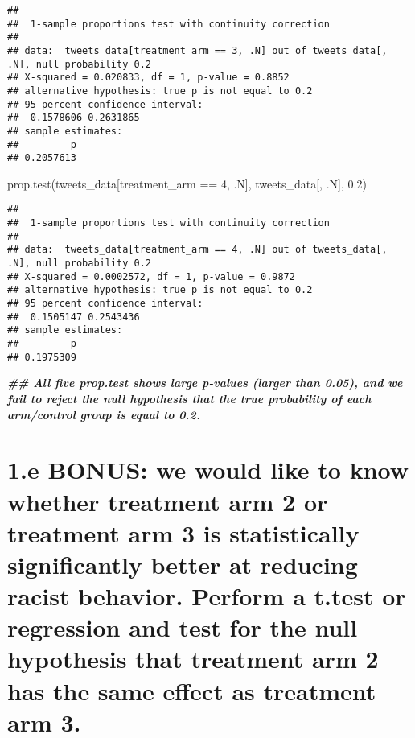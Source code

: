 \documentclass[
]{article}
\newenvironment{Shaded}{\begin{snugshade}}{\end{snugshade}}
\newcommand{\DecValTok}[1]{\textcolor[rgb]{0.00,0.00,0.81}{#1}}
\newcommand{\DocumentationTok}[1]{\textcolor[rgb]{0.56,0.35,0.01}{\textbf{\textit{#1}}}}
\newcommand{\FloatTok}[1]{\textcolor[rgb]{0.00,0.00,0.81}{#1}}
\newcommand{\FunctionTok}[1]{\textcolor[rgb]{0.00,0.00,0.00}{#1}}
\newcommand{\NormalTok}[1]{#1}
\newcommand{\SpecialCharTok}[1]{\textcolor[rgb]{0.00,0.00,0.00}{#1}}
\begin{document}
\begin{verbatim}
## 
##  1-sample proportions test with continuity correction
## 
## data:  tweets_data[treatment_arm == 3, .N] out of tweets_data[, .N], null probability 0.2
## X-squared = 0.020833, df = 1, p-value = 0.8852
## alternative hypothesis: true p is not equal to 0.2
## 95 percent confidence interval:
##  0.1578606 0.2631865
## sample estimates:
##         p 
## 0.2057613
\end{verbatim}

\begin{Shaded}
\begin{Highlighting}[]
\FunctionTok{prop.test}\NormalTok{(tweets\_data[treatment\_arm }\SpecialCharTok{==} \DecValTok{4}\NormalTok{, .N], tweets\_data[, .N], }\FloatTok{0.2}\NormalTok{)}
\end{Highlighting}
\end{Shaded}

\begin{verbatim}
## 
##  1-sample proportions test with continuity correction
## 
## data:  tweets_data[treatment_arm == 4, .N] out of tweets_data[, .N], null probability 0.2
## X-squared = 0.0002572, df = 1, p-value = 0.9872
## alternative hypothesis: true p is not equal to 0.2
## 95 percent confidence interval:
##  0.1505147 0.2543436
## sample estimates:
##         p 
## 0.1975309
\end{verbatim}

\begin{Shaded}
\begin{Highlighting}[]
\DocumentationTok{\#\# All five prop.test shows large p{-}values (larger than 0.05), and we fail to reject the null hypothesis that the true probability of each arm/control group is equal to 0.2.}
\end{Highlighting}
\end{Shaded}

\hypertarget{e-bonus-we-would-like-to-know-whether-treatment-arm-2-or-treatment-arm-3-is-statistically-significantly-better-at-reducing-racist-behavior.-perform-a-t.test-or-regression-and-test-for-the-null-hypothesis-that-treatment-arm-2-has-the-same-effect-as-treatment-arm-3.}{%
\section{1.e BONUS: we would like to know whether treatment arm 2 or
treatment arm 3 is statistically significantly better at reducing racist
behavior. Perform a t.test or regression and test for the null
hypothesis that treatment arm 2 has the same effect as treatment arm
3.}\label{e-bonus-we-would-like-to-know-whether-treatment-arm-2-or-treatment-arm-3-is-statistically-significantly-better-at-reducing-racist-behavior.-perform-a-t.test-or-regression-and-test-for-the-null-hypothesis-that-treatment-arm-2-has-the-same-effect-as-treatment-arm-3.}}
\end{document}
